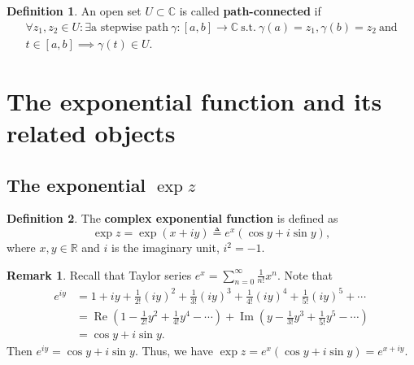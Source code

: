 \documentclass[12pt,openany]{book}
\theoremstyle{definition}
\newtheorem{definition}{Definition}
\newtheorem*{remark}{Remark}
\newcommand{\R}{\mathbb{R}}
\newcommand{\C}{\mathbb{C}}
\newcommand{\of}[1]{\left( #1 \right)}
\renewcommand{\Re}{\operatorname{Re}}
\renewcommand{\Im}{\operatorname{Im}}
\begin{document}
	\begin{tcolorbox}[title=Path-connected;]
		\begin{definition}
			An open set $U\subset\C$ is called \textbf{path-connected} if \begin{align*}
				\forall z_1,z_2\in U:\exists\text{a stepwise path}\ \gamma:[a,b]\to\C\ \text{s.t.}\ \gamma(a)=z_1,\gamma(b)=z_2\ \text{and}\\
				t\in[a,b]\implies\gamma(t)\in U.
			\end{align*}
		\end{definition}
	\end{tcolorbox}
	
	\newpage
	\section{The exponential function and its related objects}
	
	\subsection{The exponential $\exp z$}
	\begin{tcolorbox}[colback=white,colframe=defcolor,arc=5pt,title={\color{white}\bf Complex Exponential}]
		\begin{definition}
			The \textbf{complex exponential function} is defined as
			\begin{equation*}
				\exp{z} =\exp{(x+iy)} \triangleq e^{x}(\cos y + i\sin y),
			\end{equation*}
			where $x,y\in\R$ and $i$ is the imaginary unit, $i^2=-1$.
		\end{definition}
	\end{tcolorbox}
	\begin{remark}
		Recall that Taylor series $e^x=\sum_{n=0}^\infty\frac{1}{n!}x^n$. Note that \begin{align*}
			e^{iy}&=1+iy+\frac{1}{2!}(iy)^2+\frac{1}{3!}(iy)^3+\frac{1}{4!}(iy)^4+\frac{1}{5!}(iy)^5+\cdots\\
			&=\Re\of{1-\frac{1}{2!}y^2+\frac{1}{4!}y^4-\cdots}+\Im\of{y-\frac{1}{3!}y^3+\frac{1}{5!}y^5-\cdots}\\
			&=\cos y+i\sin y.
		\end{align*} Then $e^{iy}=\cos y+i\sin y$. Thus, we have $
		\exp z=e^x(\cos y+i\sin y)=e^{x+iy}.
		$
	\end{remark}
	
\end{document}
